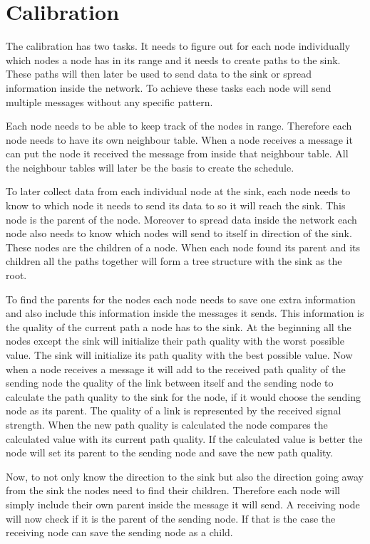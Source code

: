 \section{Calibration}
\label{chp:apr_calibration}
The calibration has two tasks. It needs to figure out for each node individually which nodes a node has in its range and it needs to create paths to the sink. These paths will then later be used to send data to the sink or spread information inside the network. To achieve these tasks each node will send multiple messages without any specific pattern. 

Each node needs to be able to keep track of the nodes in range. Therefore each node needs to have its own neighbour table. When a node receives a message it can put the node it received the message from inside that neighbour table. All the neighbour tables will later be the basis to create the schedule.

To later collect data from each individual node at the sink, each node needs to know to which node it needs to send its data to so it will reach the sink. This node is the parent of the node. Moreover to spread data inside the network each node also needs to know which nodes will send to itself in direction of the sink. These nodes are the children of a node. When each node found its parent and its children all the paths together will form a tree structure with the sink as the root.

To find the parents for the nodes each node needs to save one extra information and also include this information inside the messages it sends. This information is the quality of the current path a node has to the sink. At the beginning all the nodes except the sink will initialize their path quality with the worst possible value. The sink will initialize its path quality with the best possible value. Now when a node receives a message it will add to the received path quality of the sending node the quality of the link between itself and the sending node to calculate the path quality to the sink for the node, if it would choose the sending node as its parent. The quality of a link is represented by the received signal strength. When the new path quality is calculated the node compares the calculated value with its current path quality. If the calculated value is better the node will set its parent to the sending node and save the new path quality. 

Now, to not only know the direction to the sink but also the direction going away from the sink the nodes need to find their children. Therefore each node will simply include their own parent inside the message it will send. A receiving node will now check if it is the parent of the sending node. If that is the case the receiving node can save the sending node as a child.       

